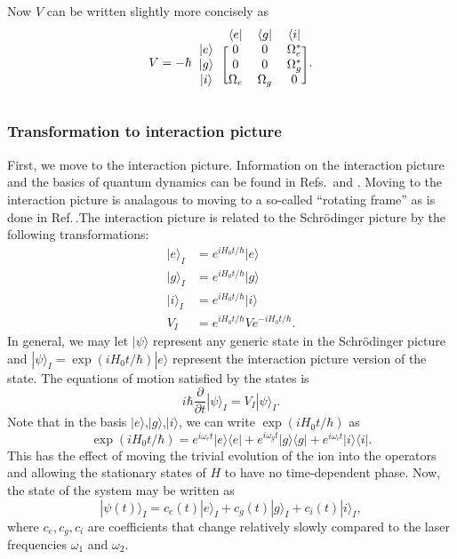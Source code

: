 Now $V$ can be written slightly more concisely as 
\begin{equation}
\label{VSchrod2}
V=-\hbar
\begin{blockarray}{cccc}
&\langle e| & \langle g| & \langle i|\\
\begin{block}{c[ccc]}
|e\rangle & 0 & 0 & \Omega_e^*\\
|g\rangle & 0 & 0 & \Omega_g^*\\
|i\rangle & \Omega_e & \Omega_g & 0 \\
\end{block} 
\end{blockarray}.
\end{equation}

\subsubsection{Transformation to interaction picture}
First, we move to the interaction picture.
Information on the interaction picture and the basics of quantum dynamics can be found in Refs.\,\cite{sakurai} and \cite{merzbacher}. Moving to the interaction picture is analagous to moving to a so-called ``rotating frame'' as is done in Ref.\,\cite{Young1997363}.The interaction picture is related to the Schr\"odinger picture by the following transformations: 
\begin{align}
\label{intTransforms}
|e\rangle_I&=e^{iH_0t/\hbar}|e\rangle\\
|g\rangle_I&=e^{iH_0t/\hbar}|g\rangle\\
|i\rangle_I&=e^{iH_0t/\hbar}|i\rangle\\
V_I&=e^{iH_0t/\hbar}Ve^{-iH_0t/\hbar}.
\end{align}
In general, we may let $|\psi\rangle$ represent any generic state in the Schr\"odinger picture and $|\psi\rangle_I=\exp(iH_0t/\hbar)|e\rangle$ represent the interaction picture version of the state. The equations of motion satisfied by the states is 
\begin{equation}
i\hbar \frac{\partial}{\partial t}|\psi\rangle_I= V_I|\psi\rangle_I.
\end{equation}
 Note that in the basis $|e\rangle$,$|g\rangle$,$|i\rangle$, we can write $\exp(iH_0t/\hbar)$ as 
\begin{equation}
\label{expH0}
\exp(iH_0t/\hbar)=e^{i\omega_e t}|e\rangle\langle e|+e^{i\omega_g t}|g\rangle \langle g|+e^{i\omega_i t}|i\rangle\langle i|.
\end{equation}
This has the effect of moving the trivial evolution of the ion into the operators and allowing the stationary states of $H$ to have no time-dependent phase. Now, the state of the system may be written as  
\begin{equation}
|\psi(t)\rangle_I = c_e(t)|e\rangle_I+c_g(t)|g\rangle_I+c_i(t)|i\rangle_I,
\end{equation}
where $c_e,c_g,c_i$ are coefficients that change relatively slowly compared to the laser frequencies $\omega_1$ and $\omega_2$.

